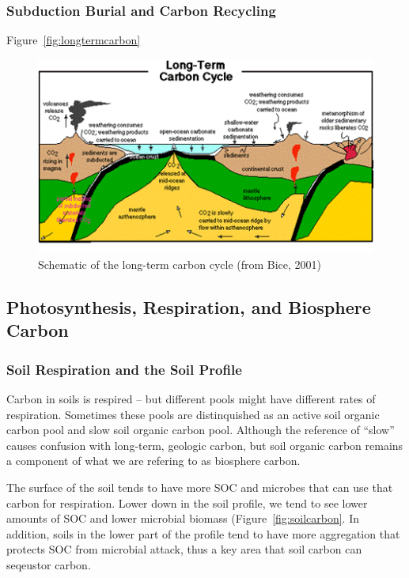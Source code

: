 \documentclass{book}\usepackage{knitr}
\begin{document}
\subsubsection{Subduction Burial and Carbon Recycling}

Figure~\ref{fig:longtermcarbon}

\begin{figure}
\includegraphics[width=\linewidth]{images/earth-system/long-term-carbon.png}
\caption{Schematic of the long-term carbon cycle (from Bice, 2001)}
\label{longtermcarbon}
\end{figure}

\subsection{Photosynthesis, Respiration, and Biosphere Carbon}

\subsubsection{Soil Respiration and the Soil Profile}

Carbon in soils is respired -- but different pools might have different rates of respiration. Sometimes these pools are distinquished as an active soil organic carbon pool and slow soil organic carbon pool. Although the reference of ``slow'' causes confusion with long-term, geologic carbon, but soil organic carbon remains a component of what we are refering to as biosphere carbon. 

The surface of the soil tends to have more SOC and microbes that can use that carbon for respiration. Lower down in the soil profile, we tend to see lower amounts of SOC and lower microbial biomass (Figure~\ref{fig:soilcarbon}. In addition, soils in the lower part of the profile tend to have more aggregation that protects SOC from microbial attack, thus a key area that soil carbon can seqeustor carbon. 
\end{document}
